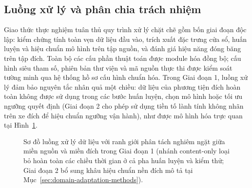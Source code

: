 \documentclass[12pt, a4paper, reqno, oneside]{book}
\begin{document}
\subsection{Luồng xử lý và phân chia trách nhiệm}
Giao thức thực nghiệm tuân thủ quy trình xử lý chặt chẽ gồm bốn giai đoạn độc lập: kiểm chứng tính toàn vẹn dữ liệu đầu vào, trích xuất đặc trưng cửa sổ, huấn luyện và hiệu chuẩn mô hình trên tập nguồn, và đánh giá hiệu năng đóng băng trên tập đích. Toàn bộ các cấu phần thuật toán được module hóa đồng bộ; cấu hình siêu tham số, phiên bản thư viện và mã nguồn thực thi được kiểm soát tường minh qua hệ thống hồ sơ cấu hình chuẩn hóa. Trong Giai đoạn 1, luồng xử lý đảm bảo nguyên tắc nhân quả một chiều: dữ liệu của phương tiện đích hoàn toàn không được sử dụng trong các bước huấn luyện, chọn mô hình hoặc tối ưu ngưỡng quyết định (Giai đoạn 2 cho phép sử dụng tiền tố lành tính không nhãn trên xe đích để hiệu chuẩn ngưỡng vận hành), như được mô hình hóa trực quan tại Hình~\ref{fig:pipeline}.

\begin{figure}[htbp]\centering
{}
\caption[Sơ đồ luồng xử lý và ranh giới nhân quả nguồn--đích]{Sơ đồ luồng xử lý dữ liệu với ranh giới phân tách nghiêm ngặt giữa miền nguồn và miền đích trong Giai đoạn 1 (nhánh content-only loại bỏ hoàn toàn các chiều thời gian ở cả pha huấn luyện và kiểm thử; Giai đoạn 2 bổ sung khâu hiệu chuẩn nền đích mô tả tại Mục~\ref{sec:domain-adaptation-methods}).}\label{fig:pipeline}
\end{figure}
\end{document}
